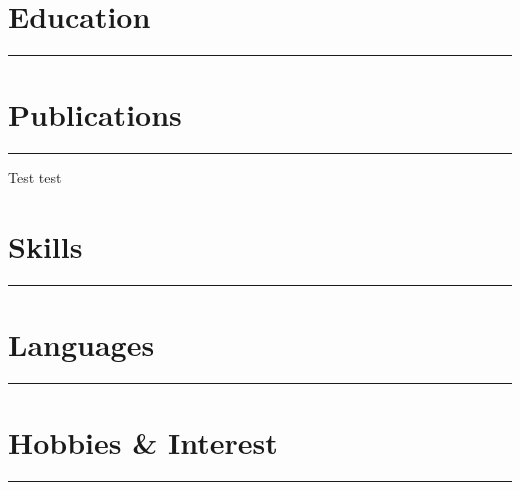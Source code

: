 \documentclass{article}
\newcommand{\rubric}[1]{
    \centering
    \vspace{1cm}
    \section*{#1}
    \hrule
    \vspace{0.3cm}
    \raggedright
}
\begin{document}
{\begin{minipage}[t][0.98\textheight][t]{0.33\textwidth}
\begin{quotation}
        \end{quotation}
        \vspace{1cm}

    \end{minipage}
}
\hspace{0.05\textwidth}
\begin{minipage}[t][0.98\textheight][t]{0.5\textwidth}
    \rubric{Education}

    \rubric{Publications}

    Test test

    \rubric{Skills}

    \rubric{Languages}

    \rubric{Hobbies \& Interest}

\end{minipage}
\end{document}
